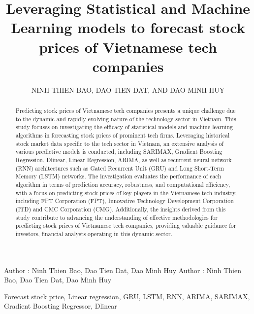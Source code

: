 \documentclass{ieeeojies}
\begin{document}
\raggedbottom 
\title{Leveraging Statistical and Machine Learning models to forecast stock prices of Vietnamese tech companies}

\author{\uppercase{Ninh Thien Bao},
    \uppercase{Dao Tien Dat, and Dao Minh Huy}}

\address[1]{Faculty of Information Systems, University of Information Technology, (e-mail: 21520621@gm.uit.edu.vn)}
\address[2]{Faculty of Information Systems, University of Information Technology, (e-mail: 21521930@gm.uit.edu.vn)}
\address[3]{Faculty of Information Systems, University of Information Technology, (e-mail: 21520912@gm.uit.edu.vn)}

\markboth
{Author \headeretal: Ninh Thien Bao, Dao Tien Dat, Dao Minh Huy}
{Author \headeretal: Ninh Thien Bao, Dao Tien Dat, Dao Minh Huy}

\begin{abstract}
    Predicting stock prices of Vietnamese tech companies presents a unique challenge due to the dynamic and rapidly evolving nature of the technology sector in Vietnam. This study focuses on investigating the efficacy of statistical models and machine learning algorithms in forecasting stock prices of prominent tech firms. Leveraging historical stock market data specific to the tech sector in Vietnam, an extensive analysis of various predictive models is conducted, including SARIMAX, Gradient Boosting Regression, Dlinear, Linear Regression, ARIMA, as well as recurrent neural network (RNN) architectures such as Gated Recurrent Unit (GRU) and Long Short-Term Memory (LSTM) networks. The investigation evaluates the performance of each algorithm in terms of prediction accuracy, robustness, and computational efficiency, with a focus on predicting stock prices of key players in the Vietnamese tech industry, including FPT Corporation (FPT), Innovative Technology Development Corporation (ITD) and CMC Corporation (CMG). Additionally, the insights derived from this study contribute to advancing the understanding of effective methodologies for predicting stock prices of Vietnamese tech companies, providing valuable guidance for investors, financial analysts operating in this dynamic sector.
\end{abstract}

\begin{keywords}
    Forecast stock price, Linear regression, GRU, LSTM, RNN, ARIMA, SARIMAX, Gradient Boosting Regressor, Dlinear 
\end{keywords}
\end{document}
